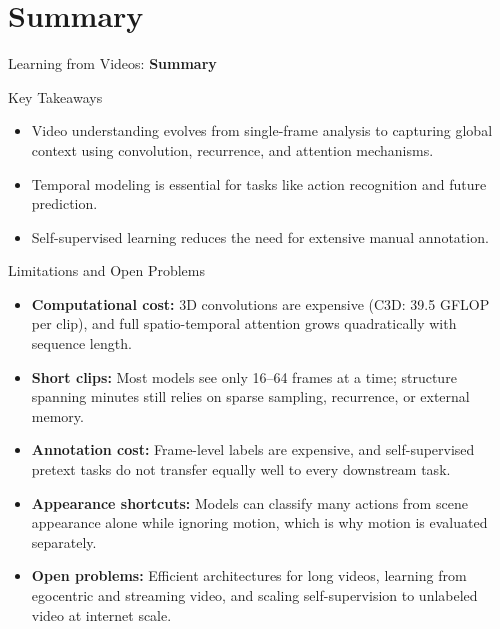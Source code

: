 \section{Summary}
\begin{frame}{}
    \LARGE Learning from Videos: \textbf{Summary}
\end{frame}

\begin{frame}{Key Takeaways}
    \large
    \begin{itemize}
        \item Video understanding evolves from single-frame analysis to capturing global context using convolution, recurrence, and attention mechanisms.
        \item Temporal modeling is essential for tasks like action recognition and future prediction.
        \item Self-supervised learning reduces the need for extensive manual annotation.
    \end{itemize}
\end{frame}

\begin{frame}{Limitations and Open Problems}
    \begin{itemize}
        \item \textbf{Computational cost:} 3D convolutions are expensive (C3D: 39.5 GFLOP per clip), and full spatio-temporal attention grows quadratically with sequence length.
        \item \textbf{Short clips:} Most models see only 16--64 frames at a time; structure spanning minutes still relies on sparse sampling, recurrence, or external memory.
        \item \textbf{Annotation cost:} Frame-level labels are expensive, and self-supervised pretext tasks do not transfer equally well to every downstream task.
        \item \textbf{Appearance shortcuts:} Models can classify many actions from scene appearance alone while ignoring motion, which is why motion is evaluated separately.
        \item \textbf{Open problems:} Efficient architectures for long videos, learning from egocentric and streaming video, and scaling self-supervision to unlabeled video at internet scale.
    \end{itemize}
\end{frame}